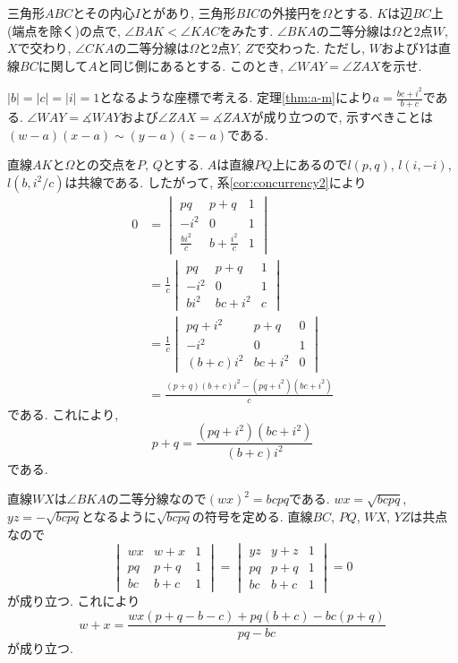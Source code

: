 \begin{bprb}[ISL2024-G5]
三角形$ABC$とその内心$I$とがあり, 三角形$BIC$の外接円を$\Omega$とする.
$K$は辺$BC$上(端点を除く)の点で, $\angle BAK<\angle KAC$をみたす.
$\angle BKA$の二等分線は$\Omega$と$2$点$W$, $X$で交わり, $\angle CKA$の二等分線は$\Omega$と$2$点$Y$, $Z$で交わった.
ただし, $W$および$Y$は直線$BC$に関して$A$と同じ側にあるとする.
このとき, $\angle WAY=\angle ZAX$を示せ.
\end{bprb}
\begin{ifsol*}
$\lvert b\rvert=\lvert c\rvert=\lvert i\rvert=1$となるような座標で考える.
定理\ref{thm:a-m}により$a=\frac{bc+i^2}{b+c}$である.
$\angle WAY=\measuredangle WAY$および$\angle ZAX=\measuredangle ZAX$が成り立つので, 示すべきことは$(w-a)(x-a)\sim(y-a)(z-a)$である.

直線$AK$と$\Omega$との交点を$P$, $Q$とする.
$A$は直線$PQ$上にあるので$l(p,q)$, $l(i,-i)$, $l(b,i^2/c)$は共線である.
したがって, 系\ref{cor:concurrency2}により
\begin{align*}
0
&=\begin{vmatrix}
pq&p+q&1\\
-i^2&0&1\\
\frac{bi^2}c&b+\frac{i^2}c&1
\end{vmatrix}\\
&=\frac 1c\begin{vmatrix}
pq&p+q&1\\
-i^2&0&1\\
bi^2&bc+i^2&c
\end{vmatrix}\\
&=\frac 1c\begin{vmatrix}
pq+i^2&p+q&0\\
-i^2&0&1\\
(b+c)i^2&bc+i^2&0
\end{vmatrix}\\
&=\frac{(p+q)(b+c)i^2-(pq+i^2)(bc+i^2)}{c}
\end{align*}
である.
これにより,
\[p+q=\frac{(pq+i^2)(bc+i^2)}{(b+c)i^2}\]
である.

直線$WX$は$\angle BKA$の二等分線なので$(wx)^2=bcpq$である.
$wx=\sqrt{bcpq}$, $yz=-\sqrt{bcpq}$となるように$\sqrt{bcpq}$の符号を定める.
直線$BC$, $PQ$, $WX$, $YZ$は共点なので
\[\begin{vmatrix}wx&w+x&1\\pq&p+q&1\\bc&b+c&1\end{vmatrix}=\begin{vmatrix}yz&y+z&1\\pq&p+q&1\\bc&b+c&1\end{vmatrix}=0\]
が成り立つ.
これにより
\[w+x=\frac{wx(p+q-b-c)+pq(b+c)-bc(p+q)}{pq-bc}\]
が成り立つ.


\end{ifsol*}
